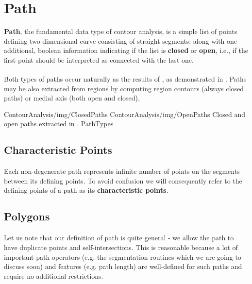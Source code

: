 \section{Path}

\paragraph*{}
\textbf{Path}, the fundamental data type of contour analysis, is a simple list of points defining two-dimensional curve consisting of straight segments; along with one additional, boolean information indicating if the list is \textbf{closed} or \textbf{open}, i.e., if the first point should be interpreted as connected with the last one.

\paragraph*{}
Both types of paths occur naturally as the results of , as demonstrated in . Paths may be also extracted from regions by computing region contours (always closed paths) or medial axis (both open and closed).

\twoFigures
{ContourAnalysis/img/ClosedPaths}
{ContourAnalysis/img/OpenPaths}
{Closed and open paths extracted in .}
{PathTypes}
{\basicWidth}

\subsection{Characteristic Points}

\paragraph*{}
Each non-degenerate path represents infinite number of points on the segments between its defining points. To avoid confusion we will consequently refer to the defining points of a path as its \textbf{characteristic points}.

\subsection{Polygons}

\paragraph*{}
Let us note that our definition of path is quite general - we allow the path to have duplicate points and self-intersections. This is reasonable because a lot of important path operators (e.g. the segmentation routines which we are going to discuss soon) and features (e.g. path length) are well-defined for such paths and require no additional restrictions.

